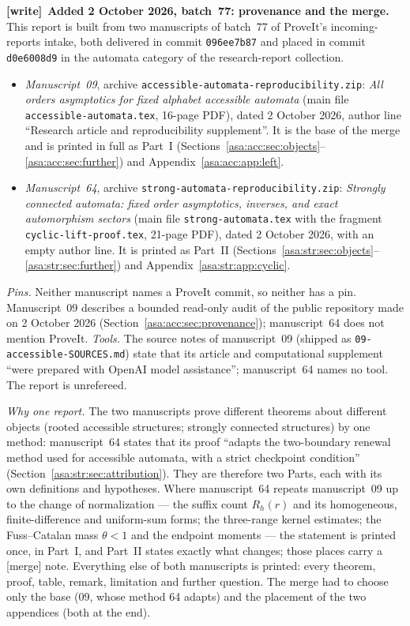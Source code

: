 \documentclass[11pt,letterpaper]{article}
\theoremstyle{remark}\newtheorem{remark}[theorem]{Remark}
\numberwithin{equation}{section}
\newenvironment{writenote}[1][]{\par\smallskip\begingroup\small
 \noindent\textbf{[write]}\if\relax\detokenize{#1}\relax\else~\textbf{#1.}\fi\ }%
 {\par\endgroup\smallskip}
\begin{document}
\begin{writenote}[Added 2 October 2026, batch~77: provenance and the merge]
This report is built from two manuscripts of batch~77 of ProveIt's
incoming-reports intake, both delivered in commit \texttt{096ee7b87} and
placed in commit \texttt{d0e6008d9} in the automata category of the
research-report collection.
\begin{itemize}
\item \emph{Manuscript~09}, archive
\texttt{accessible-\allowbreak automata-\allowbreak reproducibility.zip}:
\emph{All orders asymptotics for fixed alphabet accessible automata}
(main file \texttt{accessible-\allowbreak automata.tex}, 16-page PDF), dated
2 October 2026, author line ``Research article and reproducibility
supplement''. It is the base of the merge and is printed in full as
Part~I (Sections~\ref{asa:acc:sec:objects}--\ref{asa:acc:sec:further}) and
Appendix~\ref{asa:acc:app:left}.
\item \emph{Manuscript~64}, archive
\texttt{strong-\allowbreak automata-\allowbreak reproducibility.zip}:
\emph{Strongly connected automata: fixed order asymptotics, inverses, and
exact automorphism sectors} (main file \texttt{strong-\allowbreak automata.tex}
with the fragment \texttt{cyclic-\allowbreak lift-\allowbreak proof.tex},
21-page PDF), dated 2 October 2026, with an empty author line. It is
printed as Part~II
(Sections~\ref{asa:str:sec:objects}--\ref{asa:str:sec:further}) and
Appendix~\ref{asa:str:app:cyclic}.
\end{itemize}
\emph{Pins.} Neither manuscript names a ProveIt commit, so neither has a
pin. Manuscript~09 describes a bounded read-only audit of the public
repository made on 2 October 2026 (Section~\ref{asa:acc:sec:provenance});
manuscript~64 does not mention ProveIt. \emph{Tools.} The source notes of
manuscript~09 (shipped as \texttt{09-accessible-SOURCES.md}) state that its
article and computational supplement ``were prepared with OpenAI model
assistance''; manuscript~64 names no tool. The report is unrefereed.

\emph{Why one report.} The two manuscripts prove different theorems about
different objects (rooted accessible structures; strongly connected
structures) by one method: manuscript~64 states that its proof ``adapts the
two-boundary renewal method used for accessible automata, with a strict
checkpoint condition'' (Section~\ref{asa:str:sec:attribution}). They are
therefore two Parts, each with its own definitions and hypotheses. Where
manuscript~64 repeats manuscript~09 up to the change of normalization ---
the suffix count $R_h(r)$ and its homogeneous, finite-difference and
uniform-sum forms; the three-range kernel estimates; the Fuss--Catalan mass
$\theta<1$ and the endpoint moments --- the statement is printed once, in
Part~I, and Part~II states exactly what changes; those places carry a
\textsf{[merge]} note. Everything else of both manuscripts is printed:
every theorem, proof, table, remark, limitation and further question. The
merge had to choose only the base (09, whose method 64 adapts) and the
placement of the two appendices (both at the end).


\end{writenote}
\end{document}
